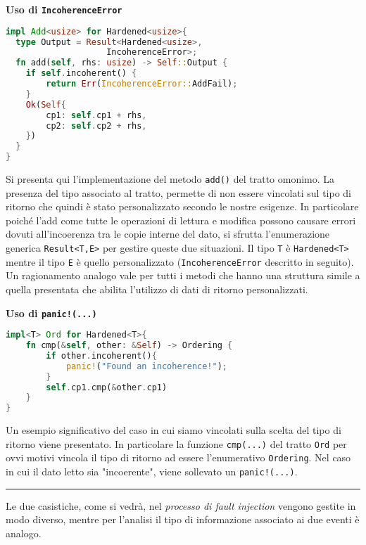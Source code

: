 \begin{multicols}{2}
\noindent
\textbf{Uso di \texttt{IncoherenceError} }
\begin{lstlisting}[language=Rust, style=boxed]
impl Add<usize> for Hardened<usize>{
  type Output = Result<Hardened<usize>, 
                    IncoherenceError>;
  fn add(self, rhs: usize) -> Self::Output {
    if self.incoherent() {
        return Err(IncoherenceError::AddFail);
    }
    Ok(Self{
        cp1: self.cp1 + rhs,
        cp2: self.cp2 + rhs,
    })
  }
}
\end{lstlisting}
Si presenta qui l'implementazione del metodo \texttt{add()} del tratto omonimo. La presenza del tipo associato al tratto, permette di non essere vincolati sul tipo di ritorno che quindi è stato personalizzato secondo le nostre esigenze. In particolare poiché l'add come tutte le operazioni di lettura e modifica possono causare errori dovuti all'incoerenza tra le copie interne del dato, si sfrutta l'enumerazione generica \texttt{Result<T,E>} per gestire queste due situazioni. Il tipo \texttt{T} è \texttt{Hardened<T>} mentre il tipo \texttt{E} è quello personalizzato (\texttt{IncoherenceError} descritto in seguito). Un ragionamento analogo vale per tutti i metodi che hanno una struttura simile a quella presentata che abilita l'utilizzo di dati di ritorno personalizzati. 

\newcolumn
\noindent
\textbf{Uso di \texttt{panic!(...)}}
\begin{lstlisting}[language=Rust, style=boxed]
impl<T> Ord for Hardened<T>{
    fn cmp(&self, other: &Self) -> Ordering {
        if other.incoherent(){
            panic!("Found an incoherence!");
        }
        self.cp1.cmp(&other.cp1)
    }
}
\end{lstlisting}
Un esempio significativo del caso in cui siamo vincolati  sulla scelta del tipo di ritorno viene presentato. In particolare la funzione \texttt{cmp(...)} del tratto \texttt{Ord} per ovvi motivi vincola il tipo di ritorno ad essere l'enumerativo \texttt{Ordering}. Nel caso in cui il dato letto sia "incoerente", viene sollevato un \texttt{panic!(...)}. \\
\hrule
\vspace{0.5cm}
\noindent
Le due casistiche, come si vedrà, nel \textit{processo di fault injection} vengono gestite in modo diverso, mentre per l'analisi il tipo di informazione associato ai due eventi è analogo.

\end{multicols}

